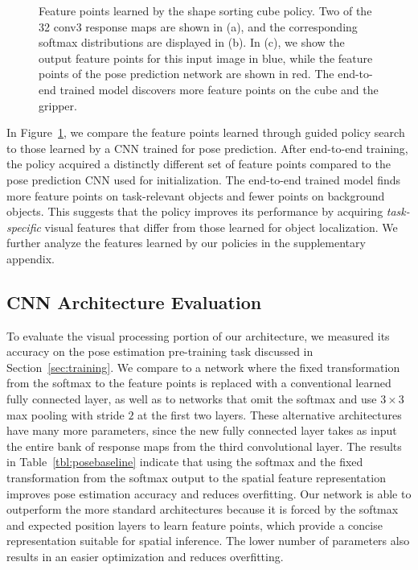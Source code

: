 \documentclass[final]{IEEEtran}
\begin{document}
\begin{figure}
\begin{picture}
\end{picture}
\caption{Feature points learned by the shape sorting cube policy. Two of the 32 conv3 response maps are shown in (a), and the corresponding softmax distributions are displayed in (b). In (c), we show the output feature points for this input image in blue, while the feature points of the pose prediction network are shown in red. The end-to-end trained model discovers more feature points on the cube and the gripper.}
\label{fig:comppoints}
\vspace{-0.2in}
\end{figure}

In Figure~\ref{fig:comppoints}, we compare the feature points learned through guided policy search to those learned by a CNN trained for pose prediction. After end-to-end training, the policy acquired a distinctly different set of feature points compared to the pose prediction CNN used for initialization. The end-to-end trained model finds more feature points on task-relevant objects and fewer points on background objects. This suggests that the policy improves its performance by acquiring \emph{task-specific} visual features that differ from those learned for object localization. We further analyze the features learned by our policies in the supplementary appendix.

\subsection{CNN Architecture Evaluation}
\label{sec:poseeval}

To evaluate the visual processing portion of our architecture, we measured its accuracy on the pose estimation pre-training task discussed in Section~\ref{sec:training}. We compare to a network where the fixed transformation from the softmax to the feature points is replaced with a conventional learned fully connected layer, as well as to networks that omit the softmax and use $3\times 3$ max pooling with stride $2$ at the first two layers. These alternative architectures have many more parameters, since the new fully connected layer takes as input the entire bank of response maps from the third convolutional layer.
The results in Table~\ref{tbl:posebaseline} indicate that using the softmax and the fixed transformation from the softmax output to the spatial feature representation improves pose estimation accuracy and reduces overfitting. Our network is able to outperform the more standard architectures because it is forced by the softmax and expected position layers to learn feature points, which provide a concise representation suitable for spatial inference. The lower number of parameters also results in an easier optimization and reduces overfitting.
\end{document}
